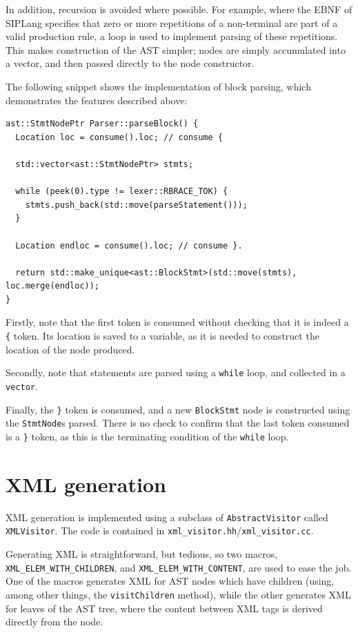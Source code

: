 \documentclass[11pt,a4paper]{scrartcl}
\begin{document}
In addition, recursion is avoided where possible. For example, where the EBNF of SIPLang specifies that zero or more repetitions of a non-terminal are part of a valid production rule, a loop is used to implement parsing of these repetitions. This makes construction of the AST simpler; nodes are simply accumulated into a vector, and then passed directly to the node constructor.

The following snippet shows the implementation of block parsing, which demonstrates the features described above:

\begin{verbatim}
ast::StmtNodePtr Parser::parseBlock() {
  Location loc = consume().loc; // consume {

  std::vector<ast::StmtNodePtr> stmts;

  while (peek(0).type != lexer::RBRACE_TOK) {
    stmts.push_back(std::move(parseStatement()));
  }

  Location endloc = consume().loc; // consume }.

  return std::make_unique<ast::BlockStmt>(std::move(stmts), loc.merge(endloc));
}
\end{verbatim}

Firstly, note that the first token is consumed without checking that it is indeed a \verb!{! token. Its location is saved to a variable, as it is needed to construct the location of the node produced.

Secondly, note that statements are parsed using a \verb!while! loop, and collected in a \verb!vector!.

Finally, the \verb!}! token is consumed, and a new \verb!BlockStmt! node is constructed using the \verb!StmtNode!s parsed. There is no check to confirm that the last token consumed is a \verb!}! token, as this is the terminating condition of the \verb!while! loop.

\newpage

\section{XML generation}

XML generation is implemented using a subclass of \verb!AbstractVisitor! called \verb!XMLVisitor!. The code is contained in \verb!xml_visitor.hh!/\verb!xml_visitor.cc!.

Generating XML is straightforward, but tedious, so two macros, \verb!XML_ELEM_WITH_CHILDREN!, and \verb!XML_ELEM_WITH_CONTENT!, are used to ease the job. One of the macros generates XML for AST nodes which have children (using, among other things, the \verb!visitChildren! method), while the other generates XML for leaves of the AST tree, where the content between XML tags is derived directly from the node.
\end{document}
